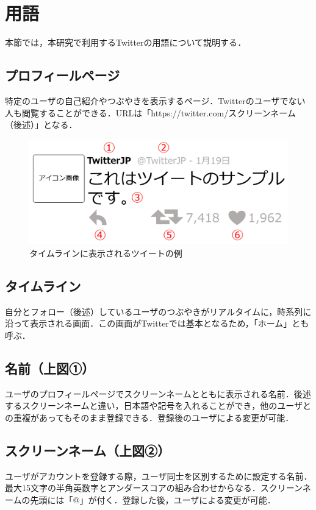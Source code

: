 \section{用語}
本節では，本研究で利用するTwitterの用語について説明する\cite{twitterwords}．

\subsection{プロフィールページ}
特定のユーザの自己紹介やつぶやきを表示するページ．Twitterのユーザでない人も閲覧することができる．URLは「https://twitter.com/スクリーンネーム（後述）」となる．

\begin{figure}[H]
\centering
\includegraphics[width=13cm]{tweet_sample.png}
\caption{タイムラインに表示されるツイートの例}\label{tweetsample}
\end{figure}

\subsection{タイムライン}
自分とフォロー（後述）しているユーザのつぶやきがリアルタイムに，時系列に沿って表示される画面．この画面がTwitterでは基本となるため，「ホーム」とも呼ぶ．

\subsection{名前（上図①）}
ユーザのプロフィールページでスクリーンネームとともに表示される名前．後述するスクリーンネームと違い，日本語や記号を入れることができ，他のユーザとの重複があってもそのまま登録できる．登録後のユーザによる変更が可能．

\subsection{スクリーンネーム（上図②）}
ユーザがアカウントを登録する際，ユーザ同士を区別するために設定する名前．最大15文字の半角英数字とアンダースコアの組み合わせからなる．スクリーンネームの先頭には「@」が付く．登録した後，ユーザによる変更が可能．

